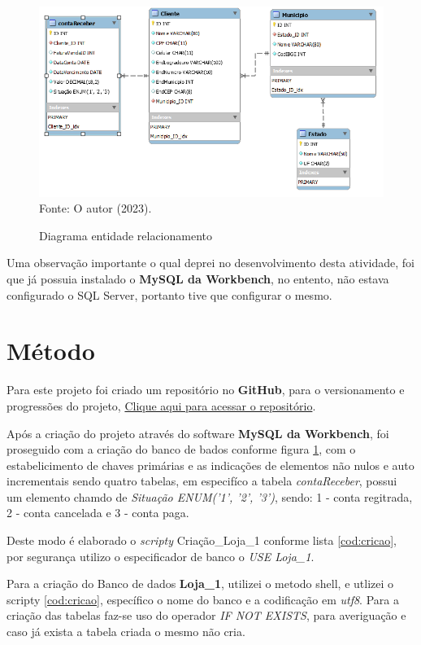 \begin{figure}[h!]
  \caption{Diagrama entidade relacionamento}
  \includegraphics[width=\textwidth]{figure/diagram_EER.png}
  \label{fig:DER}
  {\fontsize{10pt}{\baselineskip}\selectfont
  Fonte: O autor (2023).}
\end{figure}

\par Uma observação importante o qual deprei no desenvolvimento desta atividade, foi que já possuia instalado o \textbf{MySQL da Workbench}, no entento, não estava configurado o SQL Server, portanto tive que configurar o mesmo.


\section{Método}
\par Para este projeto foi criado um repositório no \textbf{GitHub}, para o versionamento e progressões do projeto, \href{https://github.com/OgliariNatan/database_and_data_development}{Clique aqui para acessar o repositório}.
\par Após a criação do projeto através do software \textbf{MySQL da Workbench}, foi proseguido com a criação do banco de bados conforme figura \ref{fig:DER}, com o estabelicimento de chaves primárias e as indicações de elementos não nulos e auto incrementais sendo quatro tabelas, em especifíco a tabela \textit{contaReceber}, possui um elemento chamdo de \textit{Situação ENUM('1', '2', '3')}, sendo: 1 - conta regitrada, 2 - conta cancelada e 3 - conta paga.


\par Deste modo é elaborado o \textit{scripty} Criação\_Loja\_1 conforme lista \ref{cod:cricao}, por segurança utilizo o especificador de banco o \textit{USE Loja\_1}.
\par Para a criação do Banco de dados \textbf{Loja\_1}, utilizei o metodo shell, e utlizei o scripty \autoref{cod:cricao}, específico o nome do banco e a codificação em \textit{utf8}. Para a criação das tabelas faz-se uso do operador \textit{IF NOT EXISTS}, para averiguação e caso já exista a tabela criada o mesmo não cria.

